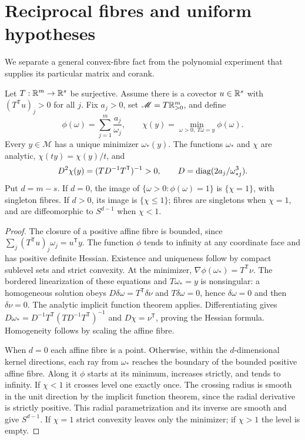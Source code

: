 \section{Reciprocal fibres and uniform hypotheses}\label{sec:reciprocal-general}
We separate a general convex-fibre fact from the polynomial experiment that supplies its particular matrix and corank.

\begin{lemma}\label{lem:reciprocal-general}
Let $T:\mathbb R^m\to\mathbb R^s$ be surjective. Assume there is a covector $u\in\mathbb R^s$ with $(T^{\mathsf T}u)_j>0$ for all $j$. Fix $a_j>0$, set $\mathscr M=T\mathbb R_{>0}^m$, and define
\[
 \phi(\omega)=\sum_{j=1}^m\frac{a_j}{\omega_j},\qquad
 \chi(y)=\min_{\omega>0,\ T\omega=y}\phi(\omega).
\]
Every $y\in\mathscr M$ has a unique minimizer $\omega_*(y)$. The functions $\omega_*$ and $\chi$ are analytic, $\chi(ty)=\chi(y)/t$, and
\begin{equation}\label{eq:general-reciprocal-hessian}
 D^2\chi(y)=(TD^{-1}T^{\mathsf T})^{-1}>0,
 \qquad D=\operatorname{diag}(2a_j/\omega_{*j}^3).
\end{equation}
Put $d=m-s$. If $d=0$, the image of $\{\omega>0:\phi(\omega)=1\}$ is $\{\chi=1\}$, with singleton fibres. If $d>0$, its image is $\{\chi\le1\}$; fibres are singletons when $\chi=1$, and are diffeomorphic to $S^{d-1}$ when $\chi<1$.
\end{lemma}
\begin{proof}
The closure of a positive affine fibre is bounded, since
$\sum_j(T^{\mathsf T}u)_j\omega_j=u^{\mathsf T}y$. The function $\phi$ tends to infinity at any coordinate face and has positive definite Hessian. Existence and uniqueness follow by compact sublevel sets and strict convexity. At the minimizer, $\nabla\phi(\omega_*)=T^{\mathsf T}\nu$. The bordered linearization of these equations and $T\omega_*=y$ is nonsingular: a homogeneous solution obeys $D\delta\omega=T^{\mathsf T}\delta\nu$ and $T\delta\omega=0$, hence $\delta\omega=0$ and then $\delta\nu=0$. The analytic implicit function theorem applies. Differentiating gives
$D\omega_*=D^{-1}T^{\mathsf T}(TD^{-1}T^{\mathsf T})^{-1}$ and $D\chi=\nu^{\mathsf T}$, proving the Hessian formula. Homogeneity follows by scaling the affine fibre.

When $d=0$ each affine fibre is a point. Otherwise, within the $d$-dimensional kernel directions, each ray from $\omega_*$ reaches the boundary of the bounded positive affine fibre. Along it $\phi$ starts at its minimum, increases strictly, and tends to infinity. If $\chi<1$ it crosses level one exactly once. The crossing radius is smooth in the unit direction by the implicit function theorem, since the radial derivative is strictly positive. This radial parametrization and its inverse are smooth and give $S^{d-1}$. If $\chi=1$ strict convexity leaves only the minimizer; if $\chi>1$ the level is empty.
\end{proof}

